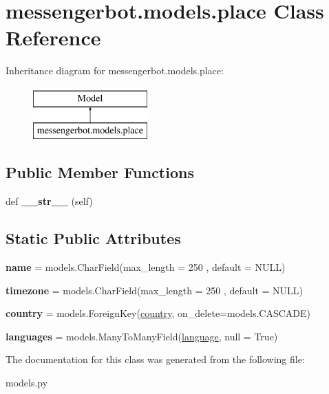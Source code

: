 \hypertarget{classmessengerbot_1_1models_1_1place}{}\section{messengerbot.\+models.\+place Class Reference}
\label{classmessengerbot_1_1models_1_1place}
Inheritance diagram for messengerbot.\+models.\+place\+:\begin{figure}[H]
\begin{center}
\leavevmode
\includegraphics[height=2.000000cm]{classmessengerbot_1_1models_1_1place}
\end{center}
\end{figure}
\subsection*{Public Member Functions}
\begin{DoxyCompactItemize}
\item 
\mbox{\label{classmessengerbot_1_1models_1_1place_ac181d9c7d3b1926c65008ba8b28efba5}} 
def {\bfseries \+\_\+\+\_\+str\+\_\+\+\_\+} (self)
\end{DoxyCompactItemize}
\subsection*{Static Public Attributes}
\begin{DoxyCompactItemize}
\item 
\mbox{\label{classmessengerbot_1_1models_1_1place_ae0d24c4671e9ce38726f84ce8ceb0103}} 
{\bfseries name} = models.\+Char\+Field(max\+\_\+length = 250 , default = \textquotesingle{}N\+U\+LL\textquotesingle{})
\item 
\mbox{\label{classmessengerbot_1_1models_1_1place_afba837819d7d201fd5862ec7af55825f}} 
{\bfseries timezone} = models.\+Char\+Field(max\+\_\+length = 250 , default = \textquotesingle{}N\+U\+LL\textquotesingle{})
\item 
\mbox{\label{classmessengerbot_1_1models_1_1place_a1446d5fdbadcd68a658aab909504dc21}} 
{\bfseries country} = models.\+Foreign\+Key(\hyperlink{classmessengerbot_1_1models_1_1country}{country}, on\+\_\+delete=models.\+C\+A\+S\+C\+A\+DE)
\item 
\mbox{\label{classmessengerbot_1_1models_1_1place_a84e97bec05192c2bbdd3123732896d2e}} 
{\bfseries languages} = models.\+Many\+To\+Many\+Field(\hyperlink{classmessengerbot_1_1models_1_1language}{language}, null = True)
\end{DoxyCompactItemize}


The documentation for this class was generated from the following file\+:\begin{DoxyCompactItemize}
\item 
models.\+py\end{DoxyCompactItemize}
